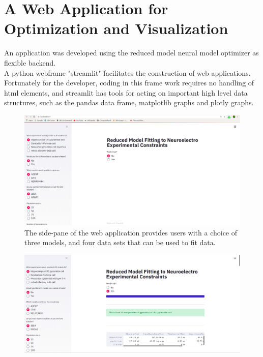 \section{A Web Application for Optimization and Visualization}
An application was developed using the reduced model neural model optimizer as flexible backend. %
\\
A python webframe "streamlit" facilitates the construction of web applications. Fortunately for the developer, coding in this frame work requires no handling of html elements, and streamlit has tools for acting on important high level data structures, such as the pandas data frame, matplotlib graphs and plotly graphs.\\
\begin{figure}
\begin{center}

\includegraphics[scale=1]{chapters/app_tex/web_app_thesis}
\caption{The side-pane of the web application provides users with a choice of three models, and four data sets that can be used to fit data.
}
\end{center}

\end{figure}
\begin{figure}
\begin{center}

\includegraphics[scale=1]{chapters/app_tex/app_results}
\end{center}

\end{figure}

